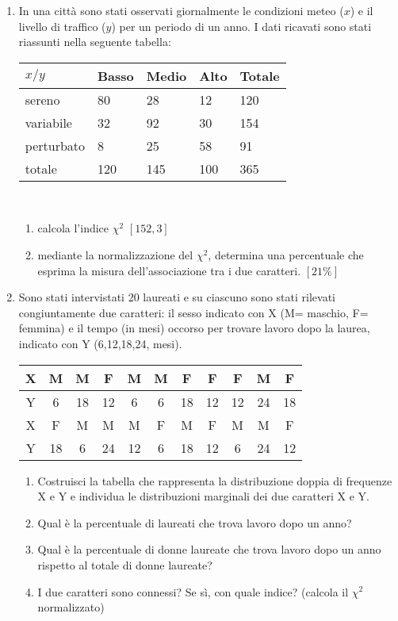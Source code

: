 \begin{enumerate}
\item In una città sono stati osservati giornalmente le condizioni meteo 
($x$) e il livello di traffico ($y$) per un periodo di un anno. I dati 
ricavati sono stati riassunti nella seguente tabella:\\
\begin{tabular}{|p{1.7cm}|p{1.7cm}|p{1.7cm}|p{1.7cm}|p{1.7cm}|}
        \hline
        $x/y$ & Basso & Medio & Alto &  Totale\\
        \hline
        sereno& 80&     28&     12&120  \\
        \hline
        variabile&      32&     92&     30&154  \\
        \hline
        perturbato&     8&      25      &58 &91 \\
        \hline
        totale &120 &145 &100 &365 \\
        \hline
\end{tabular}\\
\begin{enumerate}
        \item calcola l'indice $\chi^2$ \hfill $[152,3]$
        \item mediante la normalizzazione del $\chi^2$, determina una 
percentuale che esprima la misura dell'associazione tra i due caratteri. 
\hfill $[21\%]$
\end{enumerate}
\item Sono stati intervistati 20 laureati e su ciascuno sono stati rilevati 
congiuntamente due caratteri: il sesso indicato con X (M= maschio, F= 
femmina) e il tempo (in mesi) occorso per trovare lavoro dopo la laurea, 
indicato con Y (6,12,18,24, mesi).\\
\begin{tabular}{|c|c|c|c|c|c|c|c|c|c|c|}
\hline
X&      M&      M&      F       &M      &M&     F&      F&      F       
&M&     F\\
\hline
Y&6&18& 12&     6&      6&      18&     12&     12&     24&     18\\
\hline
X&      F&      M       &M&     M&      F&      M       &F&     M&      
M&      F\\
\hline
Y&18&   6&      24&     12&     6&      18&     12&     6       &24&    12\\
\hline
\end{tabular}
\begin{enumerate}
        \item Costruisci la tabella che rappresenta la distribuzione doppia 
di frequenze X e Y e    individua le distribuzioni marginali dei due 
caratteri X e Y.
        \item Qual è la percentuale di laureati che trova lavoro dopo un 
anno?
        \item Qual è la percentuale di donne laureate che trova lavoro dopo 
un anno rispetto al     totale di donne laureate?
        \item I due caratteri sono connessi? Se sì, con quale indice? 
(calcola il $\chi^2$ normalizzato)
\end{enumerate}
\end{enumerate}
